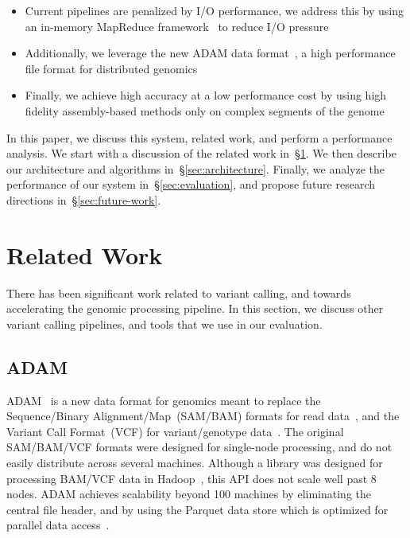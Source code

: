 \documentclass{acm_proc_article-sp}
\begin{document}
\begin{itemize}
\item Current pipelines are penalized by I/O performance, we address this by using an in-memory MapReduce framework~\cite{zaharia10}
to reduce I/O pressure
\item Additionally, we leverage the new ADAM data format~\cite{massie13}, a high performance file format for distributed genomics
\item Finally, we achieve high accuracy at a low performance cost by using high fidelity assembly-based methods only on complex
segments of the genome
\end{itemize}

In this paper, we discuss this system, related work, and perform a performance analysis. We start with a discussion of the related work
in~\S\ref{sec:related-work}. We then describe our architecture and algorithms in~\S\ref{sec:architecture}. Finally, we analyze the performance
of our system in~\S\ref{sec:evaluation}, and propose future research directions in~\S\ref{sec:future-work}.

\section{Related Work}
\label{sec:related-work}

There has been significant work related to variant calling, and towards accelerating the genomic processing pipeline. In this section, we
discuss other variant calling pipelines, and tools that we use in our evaluation.

\subsection{ADAM}
\label{sec:adam}


ADAM~\cite{massie13} is a new data format for genomics meant to replace the Sequence/Binary Alignment/Map~(SAM/BAM) formats for read
data~\cite{li09}, and the Variant Call Format~(VCF) for variant/genotype data~\cite{danecek11}. The original SAM/BAM/VCF formats were
designed for single-node processing, and do not easily distribute across several machines. Although a library was designed for processing
BAM/VCF data in Hadoop~\cite{niemenmaa12}, this API does not scale well past 8 nodes. ADAM achieves scalability beyond 100 machines
by eliminating the central file header, and by using the Parquet data store which is optimized for parallel data access~\cite{parquet}.
\end{document}
